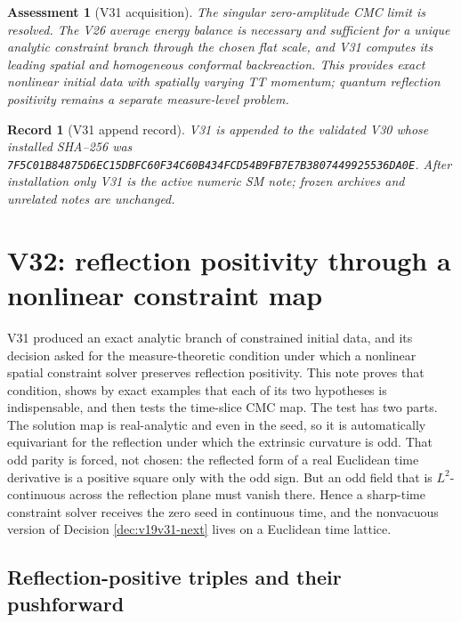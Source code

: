 \documentclass[11pt]{article}
\newtheorem{assessment}[theorem]{Assessment}
\newtheorem{record}[theorem]{Record}
\theoremstyle{remark}
\begin{document}
\begin{assessment}[V31 acquisition]
\label{ass:v19v31}
The singular zero-amplitude CMC limit is resolved.  The V26 average
energy balance is necessary and sufficient for a unique analytic
constraint branch through the chosen flat scale, and V31 computes its
leading spatial and homogeneous conformal backreaction.  This provides
exact nonlinear initial data with spatially varying TT momentum; quantum
reflection positivity remains a separate measure-level problem.
\end{assessment}

\begin{record}[V31 append record]
\label{rec:v19v31}
V31 is appended to the validated V30 whose installed SHA--256 was
\texttt{7F5C01B84875D6EC15DBFC60F34C60B434FCD54B9FB7E7B3807449925536DA0E}.
After installation only V31 is the active numeric SM note; frozen
archives and unrelated notes are unchanged.
\end{record}


\section{V32: reflection positivity through a nonlinear constraint map}
\label{sec:v19v32}

V31 produced an exact analytic branch of constrained initial data, and its
decision asked for the measure-theoretic condition under which a nonlinear
spatial constraint solver preserves reflection positivity.  This note
proves that condition, shows by exact examples that each of its two
hypotheses is indispensable, and then tests the time-slice CMC map.  The
test has two parts.  The solution map is real-analytic and even in the
seed, so it is automatically equivariant for the reflection under which
the extrinsic curvature is odd.  That odd parity is forced, not chosen:
the reflected form of a real Euclidean time derivative is a positive
square only with the odd sign.  But an odd field that is
\(L^2\)-continuous across the reflection plane must vanish there.  Hence
a sharp-time constraint solver receives the zero seed in continuous time,
and the nonvacuous version of Decision \ref{dec:v19v31-next} lives on a
Euclidean time lattice.

\subsection{Reflection-positive triples and their pushforward}
\end{document}

